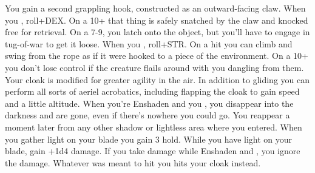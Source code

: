 \documentclass[darkmode]{dw_playbook}
\begin{document}
    {
            {You gain a second grappling hook, constructed as an outward-facing claw.  When you , roll+DEX.  On a 10+ that thing is safely snatched by the claw and knocked free for retrieval.  On a 7-9, you latch onto the object, but you’ll have to engage in tug-of-war to get it loose.
            \gap
            When you , roll+STR.  On a hit you can climb and swing from the rope as if it were hooked to a piece of the environment.  On a 10+ you don’t lose control if the creature flails around with you dangling from them.}
        \gap
            {
            Your cloak is modified for greater agility in the air.  In addition to gliding you can perform all sorts of aeriel acrobatics, including flapping the cloak to gain speed and a little altitude.}
            {When you’re Enshaden and you , you disappear into the darkness and are gone, even if there’s nowhere you could go.  You reappear a moment later from any other shadow or lightless area  where you entered.}
        \gap
            {
            When you gather light on your blade you gain 3 hold.  While you have light on your blade, gain +1d4 damage.}
        \gap
            {If you take damage while Enshaden and , you ignore the damage.  Whatever was meant to hit you hits your cloak instead.}
    }

\clearpage
~
\end{document}
